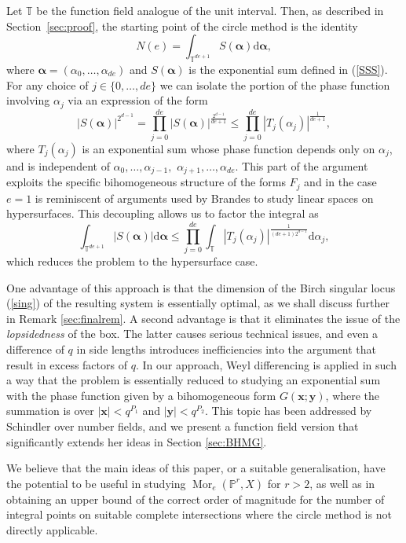 \documentclass[12pt, reqno]{amsart}
\numberwithin{equation}{section}
\renewcommand{\d}{\mathrm{d}}
\newcommand{\0}{\mathbf{0}}
\newcommand{\PP}{\mathbb{P}}
\newcommand{\TT}{\mathbb{T}}
\renewcommand{\leq}{\leqslant}
\newcommand{\x}{\mathbf{x}}
\newcommand{\y}{\mathbf{y}}
\newcommand{\bal}{\boldsymbol{\alpha}}
\def \Mor {\operatorname{Mor}}
\renewcommand{\=}{\equiv}
\newcommand{\1}{\mathbf{1}}
\theoremstyle{definition}
\begin{document}
Let $\TT$ be the function field analogue of the unit interval. Then, 
as described in Section~\ref{sec:proof}, 
the starting point of the circle method 
is the identity
$$
N(e)=\int_{\TT^{de+1}} S(\bal) \d \bal,
$$
where $\bal=(\alpha_0,\dots,\alpha_{de})$ and 
$
S(\bal)$ is the exponential sum defined in  (\ref{SSS}).
For any choice of   $j\in \{0,\dots,de\}$ we can isolate   the portion of the phase function involving $\alpha_j$ via an expression of the form
$$
|S(\bal)|^{2^{d-1}} = \prod_{j = 0 }^{de} |S(\bal)|^{ \frac{2^{d-1}}{de + 1} }  \leq \prod_{j = 0 }^{de} |T_j(\alpha_j)|^{ \frac{1}{de + 1} },
$$
where  $T_j(\alpha_j)$ is an exponential sum whose phase function depends only on $\alpha_j$, and is   independent of $\alpha_0, \dots, \alpha_{j-1},$ $\alpha_{j+1}, \dots, \alpha_{de}$.
This part of the argument exploits the specific bihomogeneous structure of the forms $F_j$  and in the case $e=1$ is reminiscent of arguments used by Brandes \cite{JuBr} to study  linear spaces on hypersurfaces. 
This decoupling allows us to factor the integral as
$$
\int_{\TT^{de+1}}|S(\bal)| \d \bal \leq
\prod_{j = 0 }^{de}  \int_{\TT} |T_j(\alpha_j)|^{ \frac{1}{ (de + 1) 2^{d-1}} } \d \alpha_j,
$$
which  reduces the problem to the hypersurface case.

One advantage of this approach is that 
the dimension of the Birch singular locus (\ref{sing}) of the resulting system is essentially optimal, as we shall discuss further in Remark \ref{sec:finalrem}. 
A second advantage is that it  eliminates the issue of the {\em lopsidedness} of the box.
The latter causes serious technical issues, and  even a difference of $q$ in side lengths
introduces inefficiencies into the argument that result in excess factors of $q$.  
In our approach,  Weyl differencing is applied in such a way that the problem is essentially reduced to
studying an exponential sum with the phase function given by  a bihomogeneous form $G(\x; \y)$, where the summation is over $|\x| < q^{P_1}$ and $|\y| < q^{P_2}$.
This topic has been addressed by Schindler  \cite{DS} over number fields, and we  present 
a function field version that significantly extends her ideas in Section \ref{sec:BHMG}.



We believe that the main ideas of this paper, or a suitable generalisation, have the potential to be useful in studying 
$\Mor_e(\PP^r, X)$ for $r > 2$, as well as in obtaining an upper bound of the correct order of magnitude for the number of integral points on suitable complete intersections where the circle method is not directly  applicable.
\end{document}
